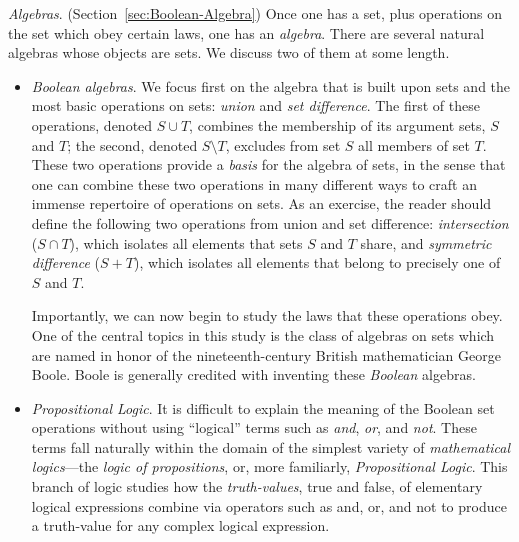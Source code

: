   
{\it Algebras}.  (Section~\ref{sec:Boolean-Algebra})  Once one has a set, plus operations on the set which obey certain laws, one has an {\it algebra}.  There are several natural algebras whose objects are sets.  We discuss two of them at some length.
\begin{itemize}
\item
{\it Boolean algebras}.  We focus first on the algebra that is built upon sets and the most basic operations on sets: {\it union} and {\it set difference}.  The first of these operations, denoted $S \cup T$, combines the membership of its argument sets, $S$ and $T$; the second, denoted $S \setminus T$, excludes from set $S$ all members of set $T$.  These two operations provide a {\em basis} for the algebra of sets, in the sense that one can combine these two operations in many different ways to craft an immense repertoire of operations on sets.  As an exercise, the reader should define the following two operations from union and set difference: {\it intersection} ($S \cap T$), which isolates all elements that sets $S$ and $T$ share, and {\it symmetric difference} ($S+T$), which isolates all elements that belong to precisely one of $S$ and $T$.


\smallskip

 
Importantly, we can now begin to study the laws that these operations obey.  One of the central topics in this study is the class of algebras on sets which are named in honor of the nineteenth-century British mathematician George Boole.  Boole is generally credited with inventing these {\it Boolean} algebras. 

\medskip\item
{\it Propositional Logic}.  It is difficult to explain the meaning of the Boolean set operations without using ``logical'' terms such as {\it and}, {\it or}, and {\it not}.  These terms fall naturally within the domain of the simplest variety of {\it mathematical logics}---the {\it logic of propositions}, or, more familiarly, {\it Propositional Logic}.  This branch of logic studies how the {\em truth-values}, {\sc true} and {\sc false}, of elementary logical expressions combine via operators such as {\sc and}, {\sc or}, and {\sc not} to produce a truth-value for any complex logical expression.
 

\smallskip


\end{itemize}

